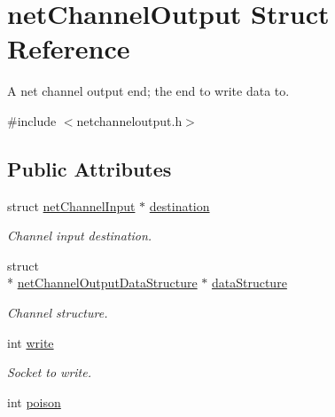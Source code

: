\hypertarget{structnetChannelOutput}{\section{net\-Channel\-Output Struct Reference}
\label{structnetChannelOutput}
}


A net channel output end; the end to write data to.  




{\ttfamily \#include $<$netchanneloutput.\-h$>$}

\subsection*{Public Attributes}
\begin{DoxyCompactItemize}
\item 
\hypertarget{structnetChannelOutput_a4d3576c1005162a2503391146fb0accc}{struct \hyperlink{structnetChannelInput}{net\-Channel\-Input} $\ast$ \hyperlink{structnetChannelOutput_a4d3576c1005162a2503391146fb0accc}{destination}}\label{structnetChannelOutput_a4d3576c1005162a2503391146fb0accc}

\begin{DoxyCompactList}\small\item\em Channel input destination. \end{DoxyCompactList}\item 
\hypertarget{structnetChannelOutput_a6037badc305eb1a2e47cbc9d99baab7d}{struct \\*
\hyperlink{structnetChannelOutputDataStructure}{net\-Channel\-Output\-Data\-Structure} $\ast$ \hyperlink{structnetChannelOutput_a6037badc305eb1a2e47cbc9d99baab7d}{data\-Structure}}\label{structnetChannelOutput_a6037badc305eb1a2e47cbc9d99baab7d}

\begin{DoxyCompactList}\small\item\em Channel structure. \end{DoxyCompactList}\item 
\hypertarget{structnetChannelOutput_af550e7d7064d2a3f67a548b9514229b3}{int \hyperlink{structnetChannelOutput_af550e7d7064d2a3f67a548b9514229b3}{write}}\label{structnetChannelOutput_af550e7d7064d2a3f67a548b9514229b3}

\begin{DoxyCompactList}\small\item\em Socket to write. \end{DoxyCompactList}\item 
\hypertarget{structnetChannelOutput_af6cadb8ba95c3f6a6059252571e624dc}{int \hyperlink{structnetChannelOutput_af6cadb8ba95c3f6a6059252571e624dc}{poison}}\label{structnetChannelOutput_af6cadb8ba95c3f6a6059252571e624dc}


\end{DoxyCompactItemize}

